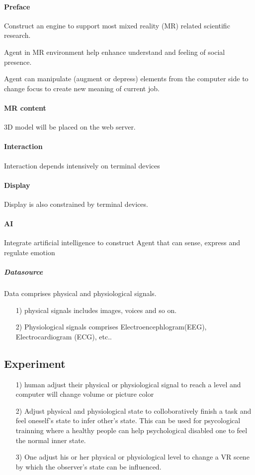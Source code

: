 \documentclass{article}
\begin{document}
\paragraph{Preface}
Construct an engine to support most mixed
reality (MR) related scientific research.

Agent in MR environment help enhance understand and 
feeling of social presence.

Agent can manipulate (augment or depress) elements from the computer side to 
change focus to create new meaning of current job.

\paragraph{MR content}
3D model will be placed on the web server.

\paragraph{Interaction}
Interaction depends intensively on terminal devices

\paragraph{Display}
Display is also constrained by terminal devices.

\paragraph{AI}
Integrate artificial intelligence to construct Agent
that can sense, express and regulate emotion

\subparagraph{Datasource}
Data comprises physical and physiological signals.
\begin{enumerate}
\item[1)]
physical signals includes images, voices and so on.
\item[2)]
Physiological signals comprises Electroencephlogram(EEG), Electrocardiogram
(ECG), etc..
\end{enumerate}

\subsection{Experiment}
\begin{enumerate}
\item[1)]
human adjust their physical or physiological signal to reach a level and computer
will change volume or picture color
\item[2)]
Adjust physical and physiological state to colloboratively finish a task and
feel oneself's state to infer other's state. This can be used for psycological 
trainning where a healthy people can help psychological disabled one to 
feel the normal inner state. 
\item[3)] 
One adjust his or her physical or physiological level to change a VR scene by which 
the observer's state can be influenced. 
\end{enumerate}
\end{document}
